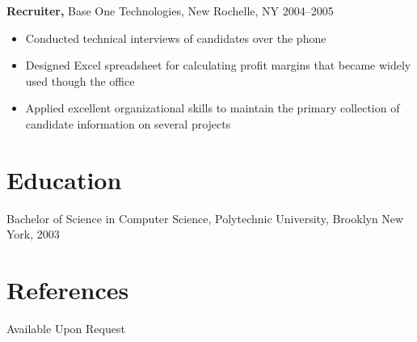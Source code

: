 \documentclass[margin]{res}
\begin{document}
\begin{resume}
{\bf Recruiter,} Base One Technologies, New Rochelle, NY \hfill 2004--2005
\begin{itemize}
  \item Conducted technical interviews of candidates over the phone
  \item Designed Excel spreadsheet for calculating profit margins that became
    widely used though the office
  \item Applied excellent organizational skills to maintain the primary
    collection of candidate information on several projects
\end{itemize}

\section{Education}
Bachelor of Science in Computer Science, Polytechnic University, Brooklyn New
York, 2003

\section{References}
Available Upon Request

\end{resume}
\end{document}
